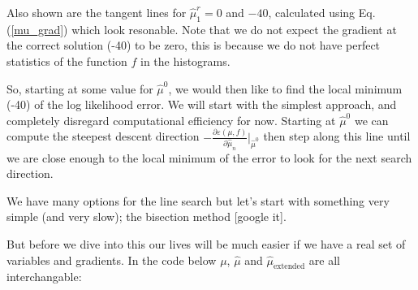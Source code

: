 \documentclass[11pt]{article}
\begin{document}
Also shown are the tangent lines for $\hat{\mu}^r_1 = 0$ and $-40$, calculated using Eq. (\ref{mu_grad}) which look resonable. Note that we do not expect the gradient at the correct solution (-40) to be zero, this is because we do not have perfect statistics of the function $f$ in the histograms.

So, starting at some value for $\hat{\mu}^0$, we would then like to find the local minimum (-40) of the log likelihood error. We will start with the simplest approach, and completely disregard computational efficiency for now. Starting at $\hat{\mu}^0$ we can compute the steepest descent direction $-\frac{\partial \varepsilon(\mu, f)}{\partial \hat{\mu}_n}|_{\hat{\mu}^0}$ then step along this line until we are close enough to the local minimum of the error to look for the next search direction. 

We have many options for the line search but let's start with something very simple (and very slow); the bisection method [google it]. 

\iffalse
But before we dive into this our lives will be much easier if we have a real set of variables and gradients. In the code below $\mu$, $\hat{\mu}$ and $\hat{\mu}_\text{extended}$ are all interchangable:
\end{document}
